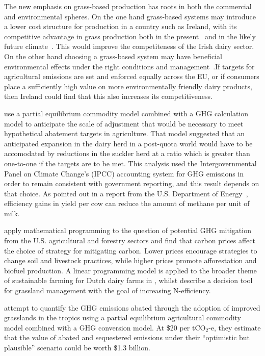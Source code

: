 \documentclass{report}
\begin{document}
The new emphasis on grass-based production has roots in both the commercial and environmental spheres. On the one hand grass-based systems may introduce a lower cost structure for production in a country such as Ireland, with its competitive advantage in grass production both in the present~\citep{jesse07} and in the likely future climate~\citep{fitzgerald09}. This would improve the competiteness of the Irish dairy sector. On the other hand choosing a grass-based system may have beneficial environmental effects under the right conditions and management~\citep{kristensen05}.If targets for agricultural emissions are set and enforced equally across the EU, or if consumers place a sufficiently high value on more environmentally friendly dairy products, then Ireland could find that this also increases its competitiveness.  

\citet{donnellan09a} use a partial equilibrium commodity model combined with a GHG calculation model to anticipate the scale of adjustment that would be necessary to meet hypothetical abatement targets in agriculture. That model suggested that an anticipated expansion in the dairy herd in a post-quota world would have to be accomodated by reductions in the suckler herd at a ratio which is greater than one-to-one if the targets are to be met. This analysis used the Intergovernmental Panel on Climate Change's (IPCC) accounting system for GHG emissions in order to remain consistent with government reporting, and this result depends on that choice. As pointed out in a report from the U.S. Department of Energy~\citep{doe99}, efficiency gains in yield per cow can reduce the amount of methane per unit of milk. 

\cite{schneider02} apply mathematical programming to the question of potential GHG mitigation from the U.S. agricultural and forestry sectors and find that carbon prices affect the choice of strategy for mitigating carbon. Lower prices encourage strategies to change soil and livestock practices, while higher prices promote afforestation and biofuel production. A linear programming model is applied to the broader theme of sustainable farming for Dutch dairy farms in \citet{vancalker04}, whilst \citet{brown05} describe a decision tool for grassland management with the goal of increasing N-efficiency.

\citet{thornton10} attempt to quantify the GHG emissions abated through the adoption of improved grasslands in the tropics using a partial equilibrium agricultural commodity model combined with a GHG conversion model. At \$20 per tCO$_2$-e, they estimate that the value of abated and sequestered emissions under their ``optimistic but plausible'' scenario could be worth \$1.3 billion.
\end{document}
